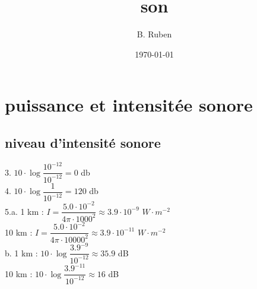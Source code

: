\documentclass{article}
\begin{document}
\title{son}
\author{B. Ruben}
\date{\today}

\maketitle

\section{puissance et intensitée sonore}
\subsection{niveau d'intensité sonore}
3. $10 \cdot \log \dfrac{10^{-12}}{10^{-12}} = 0$ db\\
4. $10 \cdot \log \dfrac{1}{10^{-12}} = 120$ db\\
5.a. 1 km : $I = \dfrac{5.0 \cdot 10^{-2}}{4 \pi \cdot 1000^2} \approx 3.9 \cdot 10^{-9}$ $W\cdot m^{-2} $\\
10 km :  $I = \dfrac{5.0 \cdot 10^{-2}}{4 \pi \cdot 10000^2} \approx 3.9 \cdot 10^{-11}$ $W \cdot m^{-2}$\\
b. 1 km : $10 \cdot \log \dfrac{3.9^{-9}}{10^{-12}} \approx 35.9 $ dB \\
10 km : $10 \cdot \log \dfrac{3.9^{-11}}{10^{-12}} \approx 16 $ dB
\end{document}
